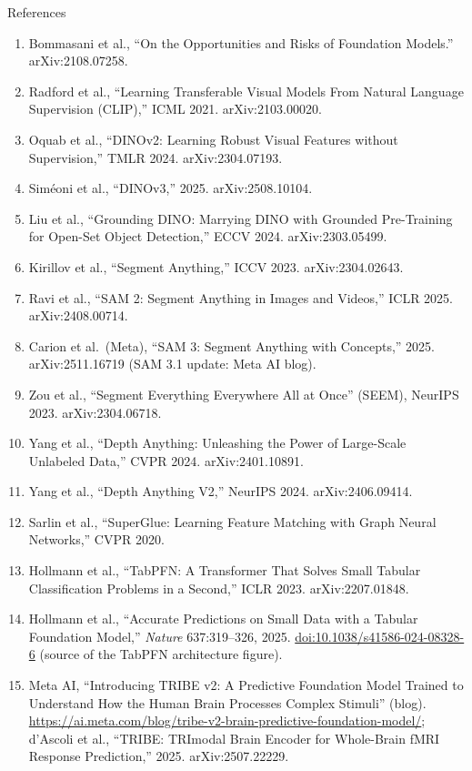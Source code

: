 \begin{frame}[allowframebreaks]{References}
  \footnotesize
  \begin{enumerate}\itemsep0.08em
    \item Bommasani et al., ``On the Opportunities and Risks of Foundation Models.'' arXiv:2108.07258.
    \item Radford et al., ``Learning Transferable Visual Models From Natural Language Supervision (CLIP),'' ICML 2021. arXiv:2103.00020.
    \item Oquab et al., ``DINOv2: Learning Robust Visual Features without Supervision,'' TMLR 2024. arXiv:2304.07193.
    \item Sim\'eoni et al., ``DINOv3,'' 2025. arXiv:2508.10104.
    \item Liu et al., ``Grounding DINO: Marrying DINO with Grounded Pre-Training for Open-Set Object Detection,'' ECCV 2024. arXiv:2303.05499.
    \item Kirillov et al., ``Segment Anything,'' ICCV 2023. arXiv:2304.02643.
    \item Ravi et al., ``SAM 2: Segment Anything in Images and Videos,'' ICLR 2025. arXiv:2408.00714.
    \item Carion et al.\ (Meta), ``SAM 3: Segment Anything with Concepts,'' 2025. arXiv:2511.16719 (SAM 3.1 update: Meta AI blog).
    \item Zou et al., ``Segment Everything Everywhere All at Once'' (SEEM), NeurIPS 2023. arXiv:2304.06718.
    \item Yang et al., ``Depth Anything: Unleashing the Power of Large-Scale Unlabeled Data,'' CVPR 2024. arXiv:2401.10891.
    \item Yang et al., ``Depth Anything V2,'' NeurIPS 2024. arXiv:2406.09414.
    \item Sarlin et al., ``SuperGlue: Learning Feature Matching with Graph Neural Networks,'' CVPR 2020.
    \item Hollmann et al., ``TabPFN: A Transformer That Solves Small Tabular Classification Problems in a Second,'' ICLR 2023. arXiv:2207.01848.
    \item Hollmann et al., ``Accurate Predictions on Small Data with a Tabular Foundation Model,'' \emph{Nature} 637:319--326, 2025. \href{https://doi.org/10.1038/s41586-024-08328-6}{doi:10.1038/s41586-024-08328-6} (source of the TabPFN architecture figure).
    \item Meta AI, ``Introducing TRIBE v2: A Predictive Foundation Model Trained to Understand How the Human Brain Processes Complex Stimuli'' (blog). \url{https://ai.meta.com/blog/tribe-v2-brain-predictive-foundation-model/}; d'Ascoli et al., ``TRIBE: TRImodal Brain Encoder for Whole-Brain fMRI Response Prediction,'' 2025. arXiv:2507.22229.

\end{enumerate}
\end{frame}

